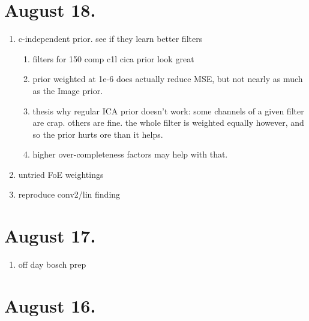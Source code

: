 \documentclass{article}
\begin{document}
\section{August 18.}

\begin{enumerate}
	\item c-independent prior. see if they learn better filters
	\begin{enumerate}
		\item filters for 150 comp c1l cica prior look great
		\item prior weighted at 1e-6 does actually reduce MSE, but not nearly as much as the Image prior.
		\item thesis why regular ICA prior doesn't work: some channels of a given filter are crap. others are fine. the whole filter is weighted equally however, and so the prior hurts ore than it helps.
		\item higher over-completeness factors may help with that.
	\end{enumerate}
	\item untried FoE weightings
	\item reproduce conv2/lin finding
\end{enumerate}



\section{August 17.}

\begin{enumerate}
	\item off day bosch prep
\end{enumerate}


\section{August 16.}
\end{document}
